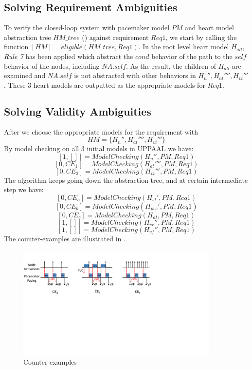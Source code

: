 \subsection{Solving Requirement Ambiguities}
To verify the closed-loop system with pacemaker model $PM$ and heart model abstraction tree $HM\_tree$ () against requirement $Req1$, we start by calling the function $[HM]=eligible(HM\_tree,Req1)$. In the root level heart model $H_{all}$, \emph{Rule 7} has been applied which abstract the $cond$ behavior of the path to the $self$ behavior of the nodes, including $NA.self$. As the result, the children of $H_{all}$ are examined and $NA.self$ is not abstracted with other behaviors in $H_n'',H_{at}'''',H_{vt}'''$. These 3 heart models are outputted as the appropriate models for $Req1$.
\subsection{Solving Validity Ambiguities}
After we choose the appropriate models for the requirement with 
$$HM=\{H_n'',H_{at}'''',H_{vt}'''\}$$
By model checking on all 3 initial models in UPPAAL we have: 
$$[1,[]]=ModelChecking(H_n'',PM,Req1)$$
 $$[0,CE_1]=ModelChecking(H_{at}'''',PM,Req1)$$
$$[0,CE_2]=ModelChecking(H_{vt}''',PM,Req1)$$
The algorithm keeps going down the abstraction tree, and at certain intermediate step we have:
 $$[0,CE_a]=ModelChecking(H_{st}',PM,Req1)$$
  $$[0,CE_b]=ModelChecking(H_{pvc}',PM,Req1)$$
	$$[0,CE_c]=ModelChecking(H_{at},PM,Req1)$$
 $$[1,[]]=ModelChecking(H_{vr}'',PM,Req1)$$
 $$[1,[]]=ModelChecking(H_{vf}'',PM,Req1)$$
The counter-examples are illustrated in .
\begin{figure}[!t]
		\centering
		\includegraphics[width=0.9\textwidth]{figs/case.pdf}
		\caption{\small Counter-examples}
		\label{fig:CE}
\end{figure}
